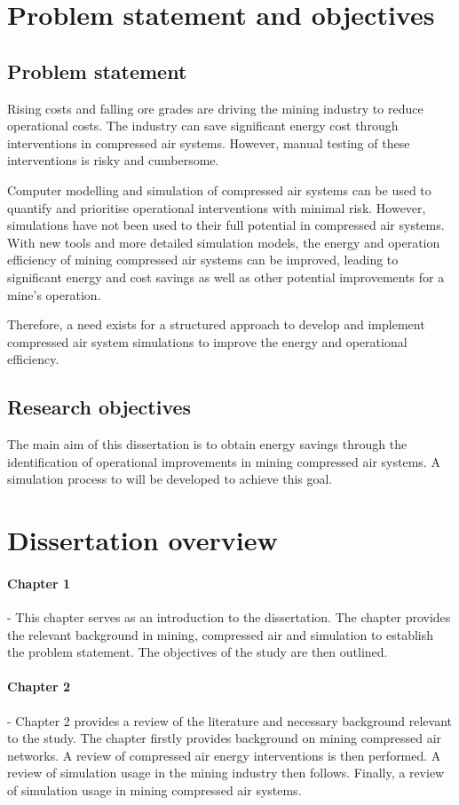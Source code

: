 \section{Problem statement and objectives}
	\subsection{Problem statement}
 		Rising costs and falling ore grades are driving the mining industry to reduce operational costs. The industry can save significant energy cost through interventions in compressed air systems. However, manual testing of these interventions is risky and cumbersome.
 		\par
 		Computer modelling and simulation of compressed air systems can be used to quantify and prioritise operational interventions with minimal risk. However, simulations have not been used to their full potential in compressed air systems. With new tools and more detailed simulation models, the energy and operation efficiency of mining compressed air systems can be improved, leading to significant energy and cost savings as well as other potential improvements for a mine's operation.
 		\par 
 		Therefore, a need exists for a structured approach to develop and implement compressed air system simulations to improve the energy and operational efficiency.
 			\subsection{Research objectives}
		The main aim of this dissertation is to obtain energy savings through the identification of operational improvements in mining compressed air systems. A simulation process to will be developed to achieve this goal.
\section{Dissertation overview}
	\paragraph{Chapter 1} \hspace{0.4cm} - \hspace{0.05cm} This chapter serves as an introduction to the dissertation. The chapter provides the relevant background in mining, compressed air and simulation to establish the problem statement. The objectives of the study are then outlined.
	\paragraph{Chapter 2} \hspace{0.4cm} - \hspace{0.05cm} Chapter 2 provides a review of the literature and necessary background relevant to the study. The chapter firstly provides background on mining compressed air networks. A review of compressed air energy interventions is then performed. A review of simulation usage in the mining industry then follows. Finally, a review of simulation usage in mining compressed air systems.
